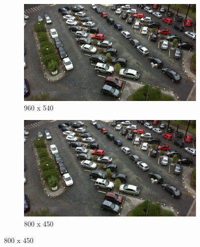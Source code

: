 \begin{appendix}
\begin{figure}[H]
    \bigskip
    \begin{subfigure}{.4\textwidth}
        \centering
        \includegraphics[width=.85\linewidth]{img/conception/image_process/downsample_only/5.png}
        \caption{960 x 540}   
    \end{subfigure}%
    \begin{subfigure}{.4\textwidth}
        \centering
        \includegraphics[width=.85\linewidth]{img/conception/image_process/downsample_only/4.png}
        \caption{800 x 450}
    \end{subfigure}%


\end{figure}
\end{appendix}
